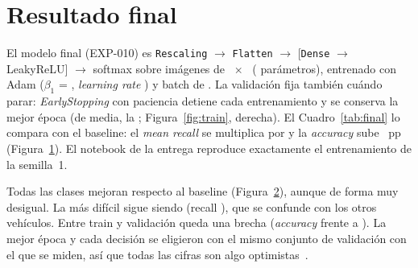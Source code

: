 \section{Resultado final}
El modelo final (EXP-010) es \texttt{Rescaling} $\rightarrow$ \texttt{Flatten} $\rightarrow$ 
[\texttt{Dense} $\rightarrow$ LeakyReLU] $\rightarrow$ softmax sobre imágenes de ~$\times$~
( parámetros), entrenado con Adam ($\beta_1$ = , \emph{learning rate}
) y batch de . La validación fija también cuándo parar: \emph{EarlyStopping} con
paciencia  detiene cada entrenamiento y se conserva la mejor época (de media, la
; Figura~\ref{fig:train}, derecha). El Cuadro~\ref{tab:final} lo compara con el baseline: el
\emph{mean recall} se multiplica por  y la \emph{accuracy} sube ~pp
(Figura~\ref{fig:progress}). El notebook de la entrega reproduce exactamente el entrenamiento de la semilla~1.

\begin{table}[h]
  \centering\small
  \caption{Baseline frente al modelo final (validación; media $\pm$ desviación típica de  semillas).}
  \label{tab:final}
\end{table}

\begin{figure}[t]
  \centering
  \caption{}
  \label{fig:progress}
\end{figure}

Todas las clases mejoran respecto al baseline (Figura~\ref{fig:final}), aunque de forma muy desigual. La más difícil
sigue siendo  (recall ), que se confunde con los otros vehículos. Entre
train y validación queda una brecha (\emph{accuracy}  frente a ). La mejor
época y cada decisión se eligieron con el mismo conjunto de validación con el que se miden, así que todas las cifras son
algo optimistas~\cite{cawley}.

\begin{figure}[t]
  \centering
  \caption{}
  \label{fig:final}
\end{figure}
